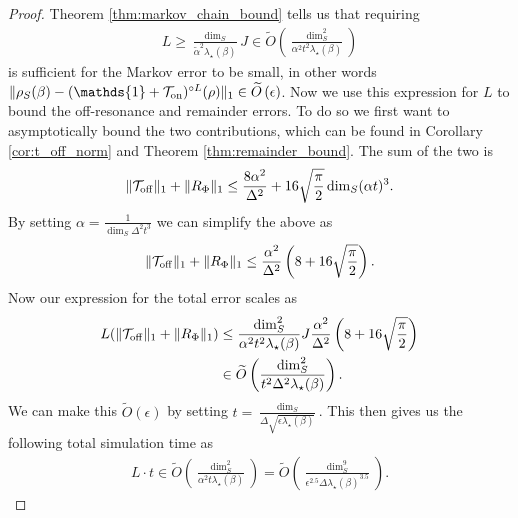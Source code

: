 \documentclass{article}
\newcommand{\on}{\rm on}
\newcommand{\off}{\rm off}
\newcommand{\norm}[1]{\| #1 \|}
\newcommand{\TT}{\mathcal{T}}
\newcommand{\bigotilde}[1]{\widetilde{O} \left( #1 \right)}
\newcommand{\identity}{\mathds{1}}
\begin{document}
\begin{proof}
    Theorem \ref{thm:markov_chain_bound} tells us that requiring 
    \begin{align}
        L \ge \frac{\dim_S}{\widetilde{\alpha}^2 \lambda_\star(\beta)} J \in \bigotilde{\frac{\dim_S^2}{\alpha^2 t^2 \lambda_\star(\beta)}}
    \end{align}
    is sufficient for the Markov error to be small, in other words $\norm{\rho_S(\beta) - (\identity + \TT_{\on})^{\circ L}(\rho)}_1 \in \bigotilde{\epsilon}$. Now we use this expression for $L$ to bound the off-resonance and remainder errors. To do so we first want to asymptotically bound the two contributions, which can be found in Corollary \ref{cor:t_off_norm} and Theorem \ref{thm:remainder_bound}. The sum of the two is
    \begin{equation}
        \norm{\TT_{\off}}_1 + \norm{R_{\Phi}}_1 \le \frac{8 \alpha^2}{\Delta^2} + 16 \sqrt{\frac{\pi}{2}} \dim_S (\alpha t)^3.
    \end{equation}
    By setting $\alpha = \frac{1}{\dim_S \Delta^2 t^3}$ we can simplify the above as
    \begin{equation}
        \norm{\TT_{\off}}_1 + \norm{R_{\Phi}}_1 \le \frac{\alpha^2}{\Delta^2} \left(8 + 16 \sqrt{\frac{\pi}{2}} \right).
    \end{equation}
    Now our expression for the total error scales as
    \begin{align}
        L (\norm{\TT_{\off}}_1 + \norm{R_{\Phi}}_1) &\le \frac{\dim_S^2}{\alpha^2 t^2 \lambda_\star(\beta)} J \frac{\alpha^2}{\Delta^2} \left(8 + 16 \sqrt{\frac{\pi}{2}} \right) \\
        &\in \bigotilde{\frac{\dim_S^2}{t^2 \Delta^2 \lambda_\star(\beta)}}.
    \end{align}
    We can make this $\bigotilde{\epsilon}$ by setting $t = \frac{\dim_S}{\Delta \sqrt{\epsilon \lambda_\star(\beta)}}$.
    This then gives us the following total simulation time as
    \begin{align}
        L\cdot t \in \bigotilde{\frac{\dim_S^2}{\alpha^2 t \lambda_\star(\beta)} } = \bigotilde{\frac{\dim_S^9}{\epsilon^{2.5} \Delta  \lambda_\star(\beta)^{3.5}}}.
    \end{align}
    

\end{proof}
\end{document}
